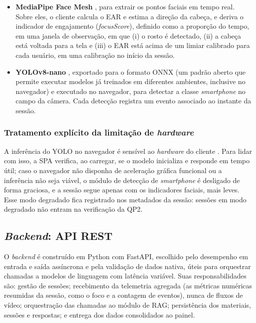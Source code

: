 \documentclass[12pt,a4paper]{article}
\begin{document}
\begin{itemize}[leftmargin=*]
  \item \textbf{MediaPipe Face Mesh} \cite{LTN19,KAGG19}, para extrair os pontos faciais em tempo real. Sobre eles, o cliente calcula o EAR \cite{SC16} e estima a direção da cabeça, e deriva o indicador de engajamento (\emph{focusScore}), definido como a proporção do tempo, em uma janela de observação, em que (i) o rosto é detectado, (ii) a cabeça está voltada para a tela e (iii) o EAR está acima de um limiar calibrado para cada usuário, em uma calibração no início da sessão.
  \item \textbf{YOLOv8-nano} \cite{RDGF16,JCQ23}, exportado para o formato ONNX (um padrão aberto que permite executar modelos já treinados em diferentes ambientes, inclusive no navegador) e executado no navegador, para detectar a classe \emph{smartphone} no campo da câmera. Cada detecção registra um evento associado ao instante da sessão.
\end{itemize}

\subsubsection{Tratamento explícito da limitação de \emph{hardware}}\label{sub:hw}

A inferência do YOLO no navegador é sensível ao \emph{hardware} do cliente \cite{JCQ23}. Para lidar com isso, a SPA verifica, ao carregar, se o modelo inicializa e responde em tempo útil; caso o navegador não disponha de aceleração gráfica funcional ou a inferência não seja viável, o módulo de detecção de \emph{smartphone} é desligado de forma graciosa, e a sessão segue apenas com os indicadores faciais, mais leves. Esse modo degradado fica registrado nos metadados da sessão: sessões em modo degradado não entram na verificação da QP2.

\subsection{\emph{Backend}: API REST}

O \emph{backend} é construído em Python com FastAPI, escolhido pelo desempenho em entrada e saída assíncrona e pela validação de dados nativa, úteis para orquestrar chamadas a modelos de linguagem com latência variável. Suas responsabilidades são: gestão de sessões; recebimento da telemetria agregada (as métricas numéricas resumidas da sessão, como o foco e a contagem de eventos), nunca de fluxos de vídeo; orquestração das chamadas ao módulo de RAG; persistência dos materiais, sessões e respostas; e entrega dos dados consolidados ao painel.
\end{document}
